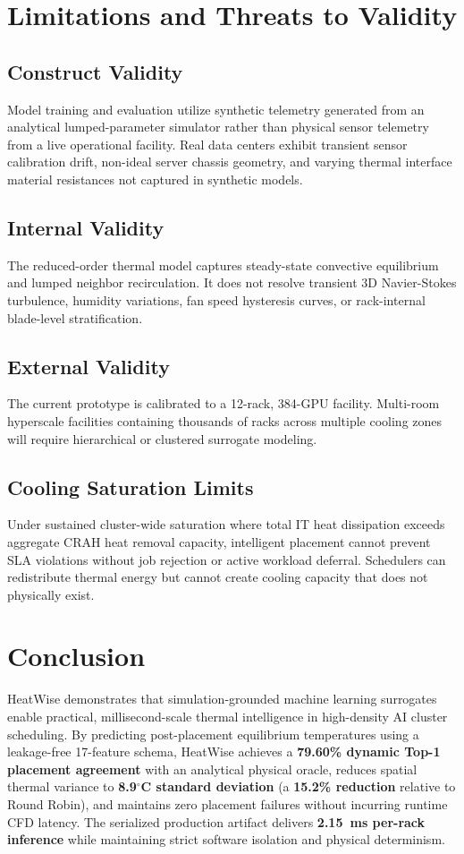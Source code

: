\documentclass[conference,10pt]{IEEEtran}
\begin{document}
\section{Limitations and Threats to Validity}
\label{sec:limitations}

\subsection{Construct Validity}
Model training and evaluation utilize synthetic telemetry generated from an analytical lumped-parameter simulator rather than physical sensor telemetry from a live operational facility. Real data centers exhibit transient sensor calibration drift, non-ideal server chassis geometry, and varying thermal interface material resistances not captured in synthetic models.

\subsection{Internal Validity}
The reduced-order thermal model captures steady-state convective equilibrium and lumped neighbor recirculation. It does not resolve transient 3D Navier-Stokes turbulence, humidity variations, fan speed hysteresis curves, or rack-internal blade-level stratification.

\subsection{External Validity}
The current prototype is calibrated to a 12-rack, 384-GPU facility. Multi-room hyperscale facilities containing thousands of racks across multiple cooling zones will require hierarchical or clustered surrogate modeling.

\subsection{Cooling Saturation Limits}
Under sustained cluster-wide saturation where total IT heat dissipation exceeds aggregate CRAH heat removal capacity, intelligent placement cannot prevent SLA violations without job rejection or active workload deferral. Schedulers can redistribute thermal energy but cannot create cooling capacity that does not physically exist.

\newpage
\section{Conclusion}
\label{sec:conclusion}
HeatWise demonstrates that simulation-grounded machine learning surrogates enable practical, millisecond-scale thermal intelligence in high-density AI cluster scheduling. By predicting post-placement equilibrium temperatures using a leakage-free 17-feature schema, HeatWise achieves a \textbf{79.60\% dynamic Top-1 placement agreement} with an analytical physical oracle, reduces spatial thermal variance to \textbf{8.9$^\circ$C standard deviation} (a \textbf{15.2\% reduction} relative to Round Robin), and maintains zero placement failures without incurring runtime CFD latency. The serialized production artifact delivers \textbf{2.15~ms per-rack inference} while maintaining strict software isolation and physical determinism.
\end{document}
